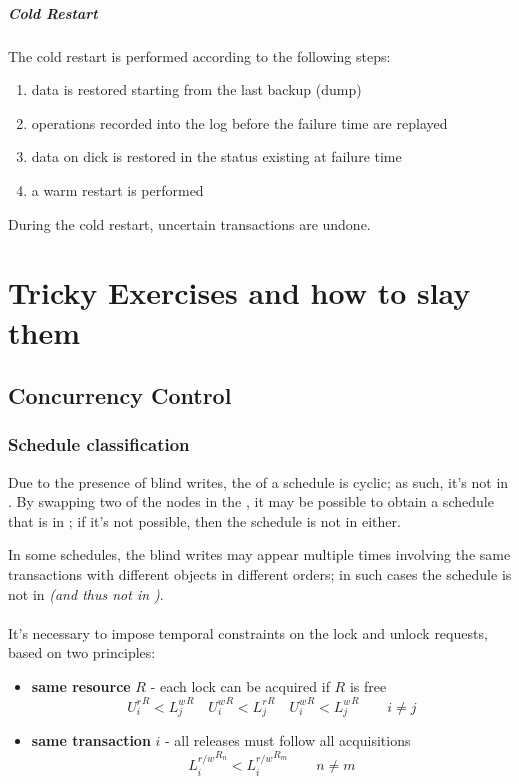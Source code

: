\documentclass[english]{article}
\begin{document}
\subparagraph*{Cold Restart}
The cold restart is performed according to the following steps:

\begin{enumerate}
  \item data is restored starting from the last backup (dump)
  \item operations recorded into the log before the failure time are replayed
  \item data on dick is restored in the status existing at failure time
  \item a warm restart is performed
\end{enumerate}

During the cold restart, uncertain transactions are undone.

\clearpage

\section{Tricky Exercises and how to slay them}

\subsection{Concurrency Control}

\subsubsection{Schedule classification}

Due to the presence of blind writes, the \cg of a schedule is cyclic;
as such, it's not in \csr.
By swapping two of the nodes in the \cg, it may be possible to obtain a schedule that is in \vsr;
if it's not possible, then the schedule is not in \vsr either.

In some schedules, the blind writes may appear multiple times involving the same transactions with different objects in different orders;
in such cases the schedule is not in \csr \textit{(and thus not in \vsr)}.

\paragraph{\tpl}

It's necessary to impose temporal constraints on the lock and unlock requests, based on two principles:

\begin{itemize}
  \item \textbf{same resource} \(R\) - each lock can be acquired if \(R\) is free
        \[ {U^r_i}^R < {L^w_j}^R \quad {U^w_i}^R < {L^r_j}^R \quad {U^w_i}^R < {L^w_j}^R \qquad i \neq j \]
  \item \textbf{same transaction} \(i\) - all releases must follow all acquisitions
        \[{L^{r/w}_i}^{R_n} < {L^{r/w}_i}^{R_m} \qquad n \neq m \]
\end{itemize}
\end{document}
